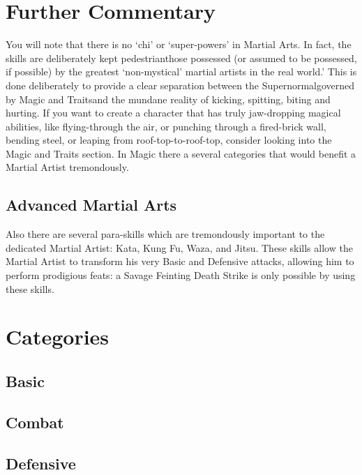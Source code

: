 \documentclass[twoside]{book}
\begin{document}
\section{Further Commentary}
      You will note that there is no `chi' or
             `super-powers' in Martial Arts. In fact, the
             skills are deliberately kept pedestrianthose
             possessed (or assumed to be possessed, if possible) by the
             greatest `non-mystical' martial artists in the
             real world.' This is done deliberately to
             provide a clear separation between the
             Supernormalgoverned by Magic and Traitsand the
             mundane reality of kicking, spitting, biting and hurting. If
             you want to create a character that has truly jaw-dropping
             magical abilities, like flying-through the air, or punching
             through a fired-brick wall, bending steel, or leaping from
             roof-top-to-roof-top, consider looking into the Magic and
             Traits section. In Magic there a several categories that
             would benefit a Martial Artist tremondously. 
\subsection{Advanced Martial Arts}
      Also there are several para-skills which are
               tremondously important to the dedicated Martial Artist:
               Kata, Kung Fu, Waza, and Jitsu. These skills allow the
               Martial Artist to transform his very Basic and Defensive
               attacks, allowing him to perform prodigious feats: a
               Savage Feinting Death Strike is only possible by using
               these skills. 
\section{Categories}
    
\subsection{Basic}
    
\subsection{Combat}
    
\subsection{Defensive}
    
\end{document}
